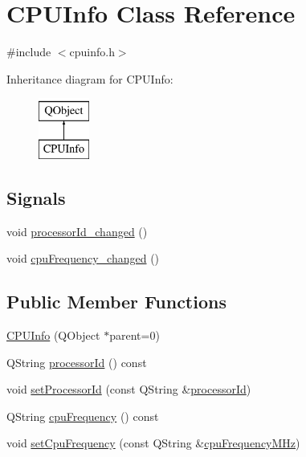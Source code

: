 \hypertarget{class_c_p_u_info}{}\section{C\+P\+U\+Info Class Reference}
\label{class_c_p_u_info}


{\ttfamily \#include $<$cpuinfo.\+h$>$}

Inheritance diagram for C\+P\+U\+Info\+:\begin{figure}[H]
\begin{center}
\leavevmode
\includegraphics[height=2.000000cm]{class_c_p_u_info}
\end{center}
\end{figure}
\subsection*{Signals}
\begin{DoxyCompactItemize}
\item 
void \hyperlink{class_c_p_u_info_a3b989dd75a0c8fc1f1317f9695ef6ae0}{processor\+Id\+\_\+changed} ()
\item 
void \hyperlink{class_c_p_u_info_aa4908f61258f88c4330f665061941354}{cpu\+Frequency\+\_\+changed} ()
\end{DoxyCompactItemize}
\subsection*{Public Member Functions}
\begin{DoxyCompactItemize}
\item 
\hyperlink{class_c_p_u_info_ae64d136af2ac562ebad60497c9c20afa}{C\+P\+U\+Info} (Q\+Object $\ast$parent=0)
\item 
Q\+String \hyperlink{class_c_p_u_info_a81e583c0d1a182dcf29243a7b6c2ae25}{processor\+Id} () const
\item 
void \hyperlink{class_c_p_u_info_af3b55c258009a1f81ff4367fce1e25a9}{set\+Processor\+Id} (const Q\+String \&\hyperlink{class_c_p_u_info_a63925ca12a5c5841a265566132461efc}{processor\+Id})
\item 
Q\+String \hyperlink{class_c_p_u_info_a5d8ffb64c8cca2b5867a4a460a0179ae}{cpu\+Frequency} () const
\item 
void \hyperlink{class_c_p_u_info_aa6607cae8f23ea68bd0a3c72cd4affda}{set\+Cpu\+Frequency} (const Q\+String \&\hyperlink{class_c_p_u_info_a08eacbffc7b4726058d011b966cd05b5}{cpu\+Frequency\+M\+Hz})
\end{DoxyCompactItemize}
